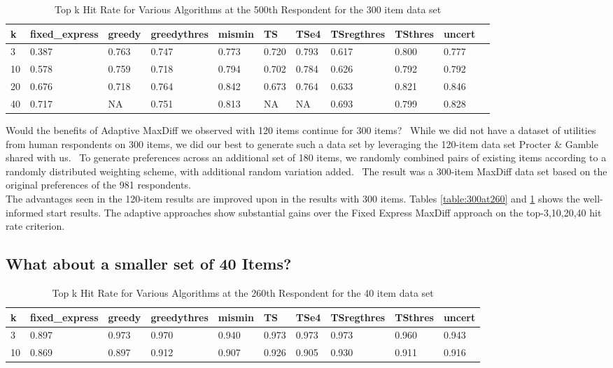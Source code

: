 \documentclass[nonblindrev]{informs3}
\begin{document}
\begin{table}
\begin{center}
\begin{tabular}{lllllllllll}
\hline   k &  fixed\_express &  greedy &  greedythres &  mismin &    TS &  TSe4 & TSregthres & TSthres &  uncert \\ \hline  3 & 0.387 &   0.763 &        0.747 &   0.773 &         0.720 & 0.793 &  0.617 &       0.800 &   0.777 \\ 10 &  0.578 &   0.759 &        0.718 &   0.794 &    0.702 & 0.784 &  0.626 &       0.792 &   0.792\\20 & 0.676 &   0.718 &        0.764 &   0.842 &     0.673 & 0.764 &     0.633 &       0.821 &    0.846 \\ 40 & 0.717 &   NA &        0.751 &   0.813 &     NA & NA &     0.693 &       0.799 &    0.828 \end{tabular}
\end{center}
\caption{Top k Hit Rate for Various Algorithms at the 500th Respondent for the 300 item data set}
\label{table:300at500}
\end{table}
Would the benefits of Adaptive MaxDiff we observed with 120 items continue for 300 items?  While we did not have a dataset of utilities from human respondents on 300 items, we did our best to generate such a data set by leveraging the 120-item data set Procter \& Gamble shared with us.  To generate preferences across an additional set of 180 items, we randomly combined pairs of existing items according to a randomly distributed weighting scheme, with additional random variation added.  The result was a 300-item MaxDiff data set based on the original preferences of the 981 respondents.\\
The advantages seen in the 120-item results are improved upon in the results with 300 items. Tables \ref{table:300at260} and \ref{table:300at500} shows the well-informed start results. The adaptive approaches show substantial gains over the Fixed Express MaxDiff approach on the top-3,10,20,40 hit rate criterion.\\
\subsection{What about a smaller set of 40 Items?}
\begin{table}
\begin{center}
\begin{tabular}{llllllllll}
\hline   k &  fixed\_express &  greedy &  greedythres &  mismin &    TS &  TSe4 &  TSregthres &  TSthres &  uncert  \\ \hline    3 &          0.897 &   0.973 &        0.970 &   0.940 & 0.973 & 0.973 &       0.973 &    0.960 &   0.943 \\  10 &          0.869 &   0.897 &        0.912 &   0.907 & 0.926 & 0.905 &       0.930 &    0.911 &   0.916  \end{tabular}
\end{center}
\caption{Top k Hit Rate for Various Algorithms at the 260th Respondent for the 40 item data set}
\label{table:40at260}
\end{table}
\end{document}
